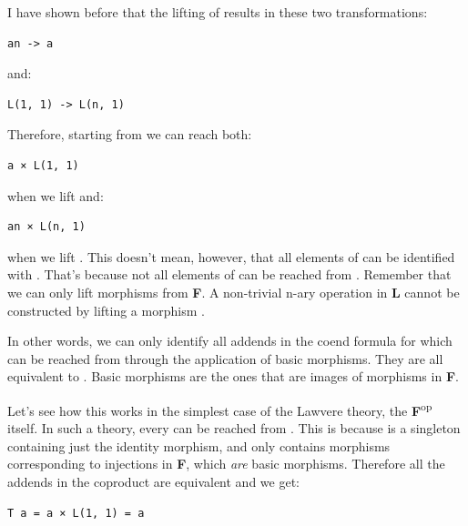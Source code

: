 I have shown before that the lifting of
 results in these two
transformations:

\begin{Verbatim}[commandchars=\\\{\}]
an -> a
\end{Verbatim}

and:

\begin{Verbatim}[commandchars=\\\{\}]
L(1, 1) -> L(n, 1)
\end{Verbatim}

Therefore, starting from  we can reach both:

\begin{Verbatim}[commandchars=\\\{\}]
a × L(1, 1)
\end{Verbatim}

when we lift  and:

\begin{Verbatim}[commandchars=\\\{\}]
an × L(n, 1)
\end{Verbatim}

when we lift . This doesn't
mean, however, that all elements of  can be
identified with . That's because not all elements
of  can be reached from . Remember
that we can only lift morphisms from \textbf{F}. A non-trivial n-ary
operation in \textbf{L} cannot be constructed by lifting a morphism
.

In other words, we can only identify all addends in the coend formula
for which  can be reached from 
through the application of basic morphisms. They are all equivalent to
. Basic morphisms are the ones that are images of
morphisms in \textbf{F}.

Let's see how this works in the simplest case of the Lawvere theory, the
\textbf{F}\textsuperscript{op} itself. In such a theory, every
 can be reached from . This is because
 is a singleton containing just the identity morphism,
and  only contains morphisms corresponding to
injections  in \textbf{F}, which \emph{are}
basic morphisms. Therefore all the addends in the coproduct are
equivalent and we get:

\begin{Verbatim}[commandchars=\\\{\}]
T a = a × L(1, 1) = a
\end{Verbatim}

